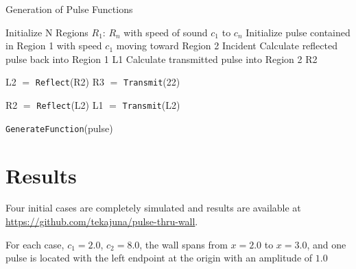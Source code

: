 \documentclass[twocolumn, letterpaper]{article}
\begin{document}
\begin{algorithm}
\caption{Generation of Pulse Functions}
\begin{algorithmic}[1]
\State Initialize N Regions $R_1$: $R_n$ with speed of sound $c_1$ to $c_n$
\State Initialize pulse contained in Region 1 with speed $c_1$ moving toward Region 2 \rightarrow Incident
\State Calculate reflected pulse back into Region 1 \rightarrow L1
\State Calculate transmitted pulse into Region 2 \rightarrow  R2

    \State L2 $=$ \texttt{Reflect}(R2)
    \State  R3 $=$ \texttt{Transmit}(22)
    
    \State R2 $=$ \texttt{Reflect}(L2)
    \State  L1 $=$ \texttt{Transmit}(L2)

\EndWhile
{}

	\texttt{GenerateFunction}(pulse)
\EndFor



\end{algorithmic}
\end{algorithm}

\section*{Results}
Four initial cases are completely simulated and results are available at \url{https://github.com/tekajuna/pulse-thru-wall}. 

For each case, $c_1 = 2.0$, $c_2 = 8.0$, the wall spans from $x=2.0$ to $x=3.0$, and one pulse is located with the left endpoint at the origin with an amplitude of $1.0$ 

\end{document}
